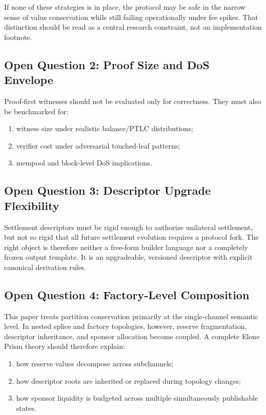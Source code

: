\documentclass[11pt,a4paper]{article}
\begin{document}
If none of these strategies is in place, the protocol may be safe in the narrow sense of value conservation while still failing operationally under fee spikes. That distinction should be read as a central research constraint, not an implementation footnote.

\subsection{Open Question 2: Proof Size and DoS Envelope}

Proof-first witnesses should not be evaluated only for correctness. They must also be benchmarked for:
\begin{enumerate}
    \item witness size under realistic balance/PTLC distributions;
    \item verifier cost under adversarial touched-leaf patterns;
    \item mempool and block-level DoS implications.
\end{enumerate}

\subsection{Open Question 3: Descriptor Upgrade Flexibility}

Settlement descriptors must be rigid enough to authorize unilateral settlement, but not so rigid that all future settlement evolution requires a protocol fork. The right object is therefore neither a free-form builder language nor a completely frozen output template. It is an upgradeable, versioned descriptor with explicit canonical derivation rules.

\subsection{Open Question 4: Factory-Level Composition}

This paper treats partition conservation primarily at the single-channel semantic level. In nested splice and factory topologies, however, reserve fragmentation, descriptor inheritance, and sponsor allocation become coupled. A complete Elone Prism theory should therefore explain:
\begin{enumerate}
    \item how reserve values decompose across subchannels;
    \item how descriptor roots are inherited or replaced during topology changes;
    \item how sponsor liquidity is budgeted across multiple simultaneously publishable states.
\end{enumerate}
\end{document}
